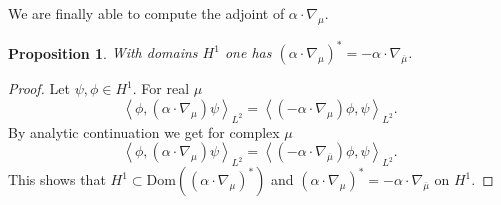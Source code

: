 \documentclass[a4paper, 12pt]{amsart}
\numberwithin{equation}{section}
\newtheorem{proposition}{Proposition}[section]
\newcommand{\la}{\left\langle} %
\newcommand{\ra}{\right\rangle} %
\newcommand{\Dom}{\mathrm{Dom}} %
\begin{document}
We are finally able to compute the adjoint of $\alpha\cdot\nabla_\mu$.

\begin{proposition}\label{FreeDistortedAdjoint}
    With domains $H^1$ one has $(\alpha\cdot\nabla_\mu)^*=-\alpha\cdot\nabla_{\overline{\mu}}$.
\end{proposition}


\begin{proof}
    Let $\psi,\phi\in H^1$. For real $\mu$
    \[\la\phi,(\alpha\cdot\nabla_\mu)\psi\ra_{L^2}=\la(-\alpha\cdot\nabla_\mu)\phi,\psi\ra_{L^2}.\]
    By analytic continuation we get for complex $\mu$
    \[\la\phi,(\alpha\cdot\nabla_\mu)\psi\ra_{L^2}=\la(-\alpha\cdot\nabla_{\overline{\mu}})\phi,\psi\ra_{L^2}.\]
    This shows that $H^1\subset\Dom((\alpha\cdot\nabla_\mu)^*)$ and $(\alpha\cdot\nabla_\mu)^*=-\alpha\cdot\nabla_{\overline{\mu}}$ on $H^1$. 
    

\end{proof}
\end{document}
